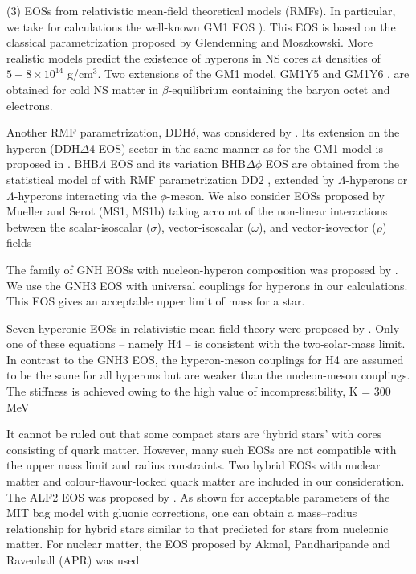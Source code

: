 \documentclass[fleqn,usenatbib]{mnras}
\begin{document}
(3) EOSs from relativistic mean-field theoretical models (RMFs).
In particular, we take for calculations the well-known GM1 EOS
\citep{GM}). This EOS is based on the classical parametrization proposed by Glendenning and Moszkowski.
More realistic models predict the existence of hyperons in NS cores
at densities of $5-8\times 10^{14}$ g/cm$^{3}$. Two extensions of the GM1
model, GM1Y5 and GM1Y6 \citep{GM-1}, are obtained for
cold NS matter in $\beta$-equilibrium containing the baryon octet and
electrons.

Another RMF parametrization, DDH$\delta$, was considered by
\cite{DDH}. Its extension on the hyperon (DDH$\Delta$4 EOS)
sector in the same manner as for the GM1 model is proposed in
\cite{DDH-2}. BHB$\Lambda$ EOS and its variation  BHB$\Delta\phi$ EOS
\citep{BHB} are obtained from the
statistical model of \cite{BHB-2} with RMF
parametrization DD2 \citep{BHB-3}, extended by $\Lambda$-hyperons
or $\Lambda$-hyperons interacting via the $\phi$-meson. We also consider EOSs
proposed by Mueller and Serot \citep{MS} (MS1, MS1b)
taking account of the non-linear interactions between the scalar-isoscalar ($\sigma$), vector-isoscalar ($\omega$), and vector-isovector ($\rho$) fields

The family of GNH EOSs with nucleon-hyperon composition
was proposed by \citep{GNH}. We use the GNH3 EOS with
universal couplings for hyperons in our calculations. This EOS gives
an acceptable upper limit of mass for a star.

Seven hyperonic EOSs in relativistic mean field theory were proposed by \cite{H4}. Only one of these equations --
namely H4 -- is consistent with the two-solar-mass limit. In contrast to the GNH3 EOS, the hyperon-meson couplings for H4 are
assumed to be the same for all hyperons but are weaker than the
nucleon-meson couplings. The stiffness is achieved owing to the
high value of incompressibility, K = 300 MeV

It cannot be ruled out that some compact stars are `hybrid stars'
with cores consisting of quark matter. However, many such EOSs
are not compatible with the upper mass limit and radius constraints.
Two hybrid EOSs with nuclear matter and colour-flavour-locked
quark matter are included in our consideration. The ALF2 EOS
was proposed by \cite{ALF2}. As shown for acceptable
parameters of the MIT bag model with gluonic corrections, one can
obtain a mass--radius relationship for hybrid stars similar to that
predicted for stars from nucleonic matter. For nuclear matter, the
EOS proposed by Akmal, Pandharipande and Ravenhall (APR) was
used
\end{document}
